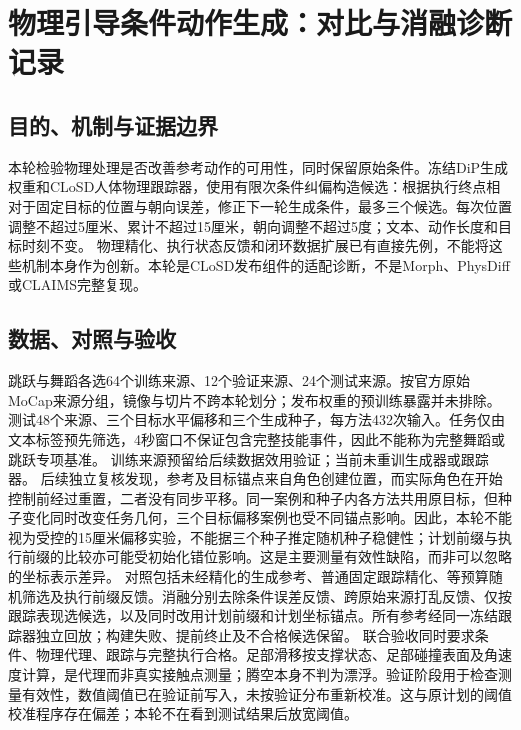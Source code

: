 \section{物理引导条件动作生成：对比与消融诊断记录}
\label{sec:physics-guided-diagnostic-20261011}
\subsection{目的、机制与证据边界}
本轮检验物理处理是否改善参考动作的可用性，同时保留原始条件。冻结DiP生成权重和CLoSD人体物理跟踪器，使用有限次条件纠偏构造候选：根据执行终点相对于固定目标的位置与朝向误差，修正下一轮生成条件，最多三个候选。每次位置调整不超过5厘米、累计不超过15厘米，朝向调整不超过5度；文本、动作长度和目标时刻不变。
物理精化、执行状态反馈和闭环数据扩展已有直接先例\cite{closd,parc,claims}，不能将这些机制本身作为创新。本轮是CLoSD发布组件的适配诊断，不是Morph、PhysDiff或CLAIMS完整复现。
\subsection{数据、对照与验收}
跳跃与舞蹈各选64个训练来源、12个验证来源、24个测试来源。按官方原始MoCap来源分组，镜像与切片不跨本轮划分；发布权重的预训练暴露并未排除。测试48个来源、三个目标水平偏移和三个生成种子，每方法432次输入。任务仅由文本标签预先筛选，4秒窗口不保证包含完整技能事件，因此不能称为完整舞蹈或跳跃专项基准。
训练来源预留给后续数据效用验证；当前未重训生成器或跟踪器。
后续独立复核发现，参考及目标锚点来自角色创建位置，而实际角色在开始控制前经过重置，二者没有同步平移。同一案例和种子内各方法共用原目标，但种子变化同时改变任务几何，三个目标偏移案例也受不同锚点影响。因此，本轮不能视为受控的15厘米偏移实验，不能据三个种子推定随机种子稳健性；计划前缀与执行前缀的比较亦可能受初始化错位影响。这是主要测量有效性缺陷，而非可以忽略的坐标表示差异。
对照包括未经精化的生成参考、普通固定跟踪精化、等预算随机筛选及执行前缀反馈。消融分别去除条件误差反馈、跨原始来源打乱反馈、仅按跟踪表现选候选，以及同时改用计划前缀和计划坐标锚点。所有参考经同一冻结跟踪器独立回放；构建失败、提前终止及不合格候选保留。
联合验收同时要求条件、物理代理、跟踪与完整执行合格。足部滑移按支撑状态、足部碰撞表面及角速度计算，是代理而非真实接触点测量；腾空本身不判为漂浮。验证阶段用于检查测量有效性，数值阈值已在验证前写入，未按验证分布重新校准。这与原计划的阈值校准程序存在偏差；本轮不在看到测试结果后放宽阈值。
